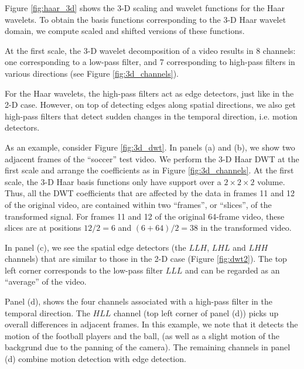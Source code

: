 Figure \ref{fig:haar_3d} shows the 3-D scaling and wavelet functions for the Haar wavelets.
To obtain the basis functions corresponding to the 3-D Haar wavelet domain, we compute scaled and shifted versions of these functions.

At the first scale, the 3-D wavelet decomposition of a video results in 8 channels: one corresponding to a low-pass filter, and 7 corresponding to high-pass filters in various directions (see Figure \ref{fig:3d_channels}).

For the Haar wavelets, the high-pass filters act as edge detectors, just like in the 2-D case. 
However, on top of detecting edges along spatial directions, we also get high-pass filters that detect sudden changes in the temporal direction, i.e. motion detectors.

As an example, consider Figure \ref{fig:3d_dwt}.
In panels (a) and (b), we show two adjacent frames of the ``soccer'' test video.
We perform the 3-D Haar DWT at the first scale and arrange the coefficients as in Figure \ref{fig:3d_channels}.
At the first scale, the 3-D Haar basis functions only have support over a $2\times 2\times 2$ volume.
Thus, all the DWT coefficients that are affected by the data in frames 11 and 12 of the original video, are contained within two ``frames'', or ``slices'', of the transformed signal.
For frames 11 and 12 of the original 64-frame video, these slices are at positions $12/2=6$ and $(6+64)/2=38$ in the transformed video.

In panel (c), we see the spatial edge detectors (the $LLH$, $LHL$ and $LHH$ channels) that are similar to those in the 2-D case (Figure \ref{fig:dwt2}).
The top left corner corresponds to the low-pass filter $LLL$ and can be regarded as an ``average'' of the video.

Panel (d), shows the four channels associated with a high-pass filter in the temporal direction.
The $HLL$ channel (top left corner of panel (d)) picks up overall differences in adjacent frames.
In this example, we note that it detects the motion of the football players and the ball, (as well as a slight motion of the backgrund due to the panning of the camera).
The remaining channels in panel (d) combine motion detection with edge detection.


